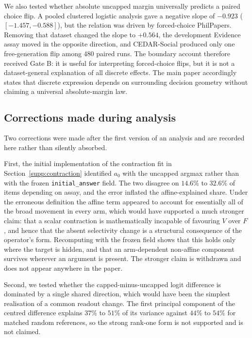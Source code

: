 \documentclass[letterpaper]{article}
\begin{document}
We also tested whether absolute uncapped margin universally predicts a paired choice flip.  A pooled clustered logistic analysis gave a negative slope of $-0.923$ ($[-1.457,-0.588]$), but the relation was driven by forced-choice PhilPapers.  Removing that dataset changed the slope to $+0.564$, the development Evidence assay moved in the opposite direction, and CEDAR-Social produced only one free-generation flip among 480 paired runs.  The boundary account therefore received Gate B: it is useful for interpreting forced-choice flips, but it is not a dataset-general explanation of all discrete effects.  The main paper accordingly states that discrete expression depends on surrounding decision geometry without claiming a universal absolute-margin law.

\subsection{Corrections made during analysis}

Two corrections were made after the first version of an analysis and are recorded here rather than silently absorbed.

First, the initial implementation of the contraction fit in Section~\ref{supp:contraction} identified $a_0$ with the uncapped argmax rather than with the frozen \texttt{initial\_answer} field. The two disagree on $14.6\%$ to $32.6\%$ of items depending on assay, and the error inflated the affine-explained share. Under the erroneous definition the affine term appeared to account for essentially all of the broad movement in every arm, which would have supported a much stronger claim: that a scalar contraction is mathematically incapable of favouring $V$ over $F$, and hence that the absent selectivity change is a structural consequence of the operator's form. Recomputing with the frozen field shows that this holds only where the target is hidden, and that an arm-dependent non-affine component survives wherever an argument is present. The stronger claim is withdrawn and does not appear anywhere in the paper.

Second, we tested whether the capped-minus-uncapped logit difference is dominated by a single shared direction, which would have been the simplest realisation of a common readout change. The first principal component of the centred difference explains $37\%$ to $51\%$ of its variance against $44\%$ to $54\%$ for matched random references, so the strong rank-one form is not supported and is not claimed.
\end{document}
